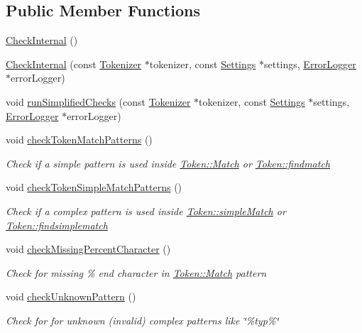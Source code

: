 \subsection*{Public Member Functions}
\begin{DoxyCompactItemize}
\item 
\hyperlink{class_check_internal_ad362983e379a8c73cc55dfdd7b5df7c4}{Check\-Internal} ()
\item 
\hyperlink{class_check_internal_a0bffdfd26bab7fc3fc605b1ef9e83c9a}{Check\-Internal} (const \hyperlink{class_tokenizer}{Tokenizer} $\ast$tokenizer, const \hyperlink{class_settings}{Settings} $\ast$settings, \hyperlink{class_error_logger}{Error\-Logger} $\ast$error\-Logger)
\item 
void \hyperlink{class_check_internal_aa54976ec7aa482f66fa8582f6b06f60d}{run\-Simplified\-Checks} (const \hyperlink{class_tokenizer}{Tokenizer} $\ast$tokenizer, const \hyperlink{class_settings}{Settings} $\ast$settings, \hyperlink{class_error_logger}{Error\-Logger} $\ast$error\-Logger)
\item 
void \hyperlink{class_check_internal_aa7504dd922ef1acc2597efd0932ff5ad}{check\-Token\-Match\-Patterns} ()
\begin{DoxyCompactList}\small\item\em Check if a simple pattern is used inside \hyperlink{class_token_a519623098bde6496825e49364575dadf}{Token\-::\-Match} or \hyperlink{class_token_a129738123e5ddc405eae3245a1c7d487}{Token\-::findmatch} \end{DoxyCompactList}\item 
void \hyperlink{class_check_internal_a86f1888ad76d512afb784a685e660249}{check\-Token\-Simple\-Match\-Patterns} ()
\begin{DoxyCompactList}\small\item\em Check if a complex pattern is used inside \hyperlink{class_token_a0f73cc13be77ebc806962972a8ae8092}{Token\-::simple\-Match} or \hyperlink{class_token_a0b7c3cba682eb1ec914935468d13f909}{Token\-::findsimplematch} \end{DoxyCompactList}\item 
void \hyperlink{class_check_internal_aafa133c29593974908709d29b0fd5031}{check\-Missing\-Percent\-Character} ()
\begin{DoxyCompactList}\small\item\em Check for missing \% end character in \hyperlink{class_token_a519623098bde6496825e49364575dadf}{Token\-::\-Match} pattern \end{DoxyCompactList}\item 
void \hyperlink{class_check_internal_a444fbce5acde316b7aa6de776c84427d}{check\-Unknown\-Pattern} ()
\begin{DoxyCompactList}\small\item\em Check for for unknown (invalid) complex patterns like \char`\"{}\%typ\%\char`\"{} \end{DoxyCompactList}\end{DoxyCompactItemize}
